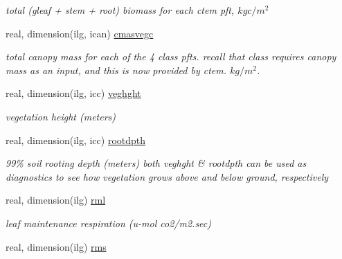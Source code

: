 \begin{DoxyCompactItemize}
\begin{DoxyCompactList}\small\item\em total (gleaf + stem + root) biomass for each ctem pft, $kg c/m^2$ \end{DoxyCompactList}\item 
\hypertarget{structctem__statevars_1_1veg__gat_a50643219bc214747a4d326b9aa9e48b7}{}real, dimension(ilg, ican) \hyperlink{structctem__statevars_1_1veg__gat_a50643219bc214747a4d326b9aa9e48b7}{cmasvegc}\label{structctem__statevars_1_1veg__gat_a50643219bc214747a4d326b9aa9e48b7}

\begin{DoxyCompactList}\small\item\em total canopy mass for each of the 4 class pfts. recall that class requires canopy mass as an input, and this is now provided by ctem. $kg/m^2$. \end{DoxyCompactList}\item 
\hypertarget{structctem__statevars_1_1veg__gat_a0aadd57132ddff5b475f56e093d7495f}{}real, dimension(ilg, icc) \hyperlink{structctem__statevars_1_1veg__gat_a0aadd57132ddff5b475f56e093d7495f}{veghght}\label{structctem__statevars_1_1veg__gat_a0aadd57132ddff5b475f56e093d7495f}

\begin{DoxyCompactList}\small\item\em vegetation height (meters) \end{DoxyCompactList}\item 
\hypertarget{structctem__statevars_1_1veg__gat_ac339e56b560053fb2afe37cf5abcc349}{}real, dimension(ilg, icc) \hyperlink{structctem__statevars_1_1veg__gat_ac339e56b560053fb2afe37cf5abcc349}{rootdpth}\label{structctem__statevars_1_1veg__gat_ac339e56b560053fb2afe37cf5abcc349}

\begin{DoxyCompactList}\small\item\em 99\% soil rooting depth (meters) both veghght \& rootdpth can be used as diagnostics to see how vegetation grows above and below ground, respectively \end{DoxyCompactList}\item 
\hypertarget{structctem__statevars_1_1veg__gat_a2587b21d77389d025197409c7f6bbc6d}{}real, dimension(ilg) \hyperlink{structctem__statevars_1_1veg__gat_a2587b21d77389d025197409c7f6bbc6d}{rml}\label{structctem__statevars_1_1veg__gat_a2587b21d77389d025197409c7f6bbc6d}

\begin{DoxyCompactList}\small\item\em leaf maintenance respiration (u-\/mol co2/m2.\+sec) \end{DoxyCompactList}\item 
\hypertarget{structctem__statevars_1_1veg__gat_ae11a22ff73d4311f041c08a32bcbf19f}{}real, dimension(ilg) \hyperlink{structctem__statevars_1_1veg__gat_ae11a22ff73d4311f041c08a32bcbf19f}{rms}\label{structctem__statevars_1_1veg__gat_ae11a22ff73d4311f041c08a32bcbf19f}


\end{DoxyCompactItemize}
